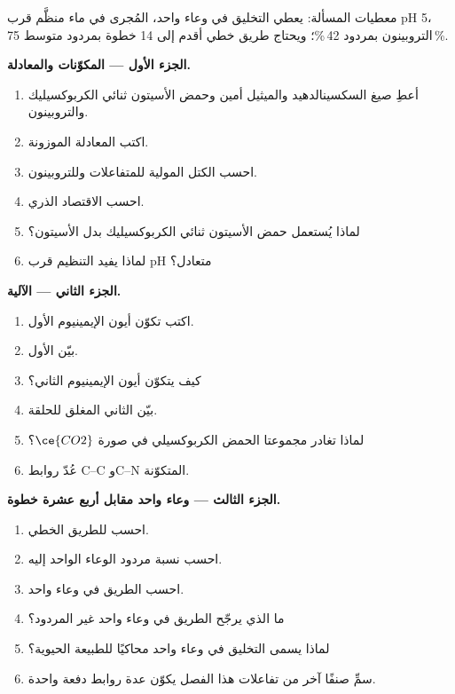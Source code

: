 \begin{problem}
\label{pb:b3:total-synthesis:1}
معطيات المسألة: يعطي التخليق في وعاء واحد، المُجرى في ماء منظَّم قرب pH 5،
التروبينون بمردود 42\,\%؛ ويحتاج طريق خطي أقدم إلى 14 خطوة بمردود متوسط 75\,\%.

\medskip\noindent\textbf{الجزء الأول --- المكوّنات والمعادلة.}
\begin{enumerate}
  \item أعطِ صيغ السكسينالدهيد والميثيل أمين وحمض الأسيتون ثنائي الكربوكسيليك
        والتروبينون.
  \item اكتب المعادلة الموزونة.
  \item احسب الكتل المولية للمتفاعلات وللتروبينون.
  \item احسب الاقتصاد الذري.
  \item لماذا يُستعمل حمض الأسيتون ثنائي الكربوكسيليك بدل الأسيتون؟
  \item لماذا يفيد التنظيم قرب pH متعادل؟
\end{enumerate}

\medskip\noindent\textbf{الجزء الثاني --- الآلية.}
\begin{enumerate}[resume]
  \item اكتب تكوّن أيون الإيمينيوم الأول.
  \item بيّن  الأول.
  \item كيف يتكوّن أيون الإيمينيوم الثاني؟
  \item بيّن  الثاني المغلق للحلقة.
  \item لماذا تغادر مجموعتا الحمض الكربوكسيلي في صورة $\ce{CO2}$؟
  \item عُدّ روابط C--C وC--N المتكوّنة.
\end{enumerate}

\medskip\noindent\textbf{الجزء الثالث --- وعاء واحد مقابل أربع عشرة خطوة.}
\begin{enumerate}[resume]
  \item احسب  للطريق الخطي.
  \item احسب نسبة مردود الوعاء الواحد إليه.
  \item احسب  الطريق في وعاء واحد.
  \item ما الذي يرجّح الطريق في وعاء واحد غير المردود؟
  \item لماذا يسمى التخليق في وعاء واحد محاكيًا للطبيعة الحيوية؟
  \item سمِّ صنفًا آخر من تفاعلات هذا الفصل يكوّن عدة روابط دفعة واحدة.
\end{enumerate}


\end{problem}
